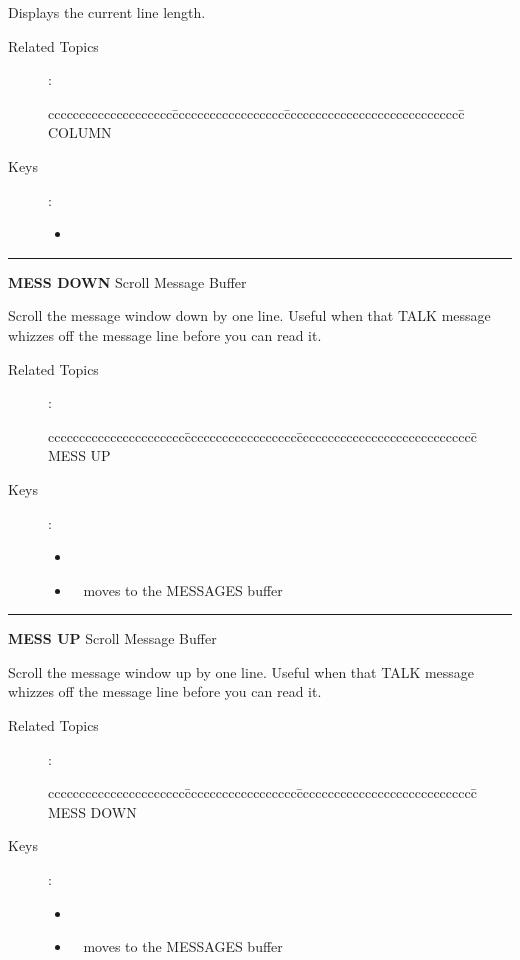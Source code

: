 \medskip
  Displays the current line length.

\begin{description}
\item[Related Topics]:
\begin{tabbing}
cccccccccccccccccccc\=cccccccccccccccccc\=ccccccccccccccccccccccccccccc\=\kill
COLUMN \\
\end{tabbing}

\item[Keys]:
         \begin{itemize}
         \item \gold\ 
         \end{itemize}
\end{description}

\goodbreak

\rule{\textwidth}{0.3mm}

{\Large {\bf MESS DOWN} \hfill Scroll Message Buffer}

\medskip
  Scroll the message window down by one line. Useful when that TALK
  message whizzes off the message line before you can read it.

\begin{description}
\item[Related Topics]:
\begin{tabbing}
cccccccccccccccccccccc\=cccccccccccccccccc\=ccccccccccccccccccccccccccccc\=\kill
MESS UP \\
\end{tabbing}
\item[Keys]:
        \begin{itemize}
        \item \gold\ 
        \item \gold\  moves to the MESSAGES buffer
        \end{itemize}
\end{description}

\goodbreak

\rule{\textwidth}{0.3mm}

{\Large {\bf MESS UP} \hfill Scroll Message Buffer}

\medskip
  Scroll the message window up by one line. Useful when that TALK
  message whizzes off the message line before you can read it.

\begin{description}
\item[Related Topics]:
\begin{tabbing}
cccccccccccccccccccccc\=cccccccccccccccccc\=ccccccccccccccccccccccccccccc\=\kill
MESS DOWN \\
\end{tabbing}

\item[Keys]:
        \begin{itemize}
        \item \gold\ 
        \item \gold\  moves to the MESSAGES buffer
        \end{itemize}
\end{description}

